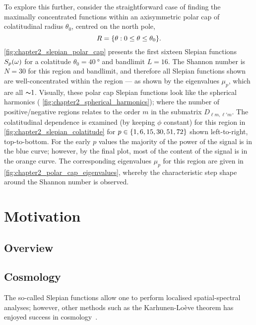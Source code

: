 To explore this further, consider the straightforward case of finding the maximally concentrated functions within an axisymmetric polar cap of colatitudinal radius \(\theta_{0}{}\), centred on the north pole, \ie{}
%
\begin{equation}
	R
	= \{\theta: 0 \leq \theta \leq \theta_{0}\}.
\end{equation}
%
\cref{fig:chapter2_slepian_polar_cap} presents the first sixteen Slepian functions \({S}_{p}(\omega)\) for a colatitude \(\theta_{0}=\SI{40}{\degree}\) and bandlimit \(L=16\).
The Shannon number is \(N=30\) for this region and bandlimit, and therefore all Slepian functions shown are well-concentrated within the region --- as shown by the eigenvalues \(\mu_{p}\), which are all \({\thicksim}1\).
Visually, these polar cap Slepian functions look like the spherical harmonics (\cf{} \cref{fig:chapter2_spherical_harmonics}); where the number of positive/negative regions relates to the order \(m\) in the submatrix \(D_{\ell m,\ell'm}\).
The colatitudinal dependence is examined (by keeping \(\phi{}\) constant) for this region in \cref{fig:chapter2_slepian_colatitude} for \(p \in \{1,6,15,30,51,72\}\) shown left-to-right, top-to-bottom.
For the early \(p\) values the majority of the power of the signal is in the blue curve; however, by the final plot, most of the content of the signal is in the orange curve.
The corresponding eigenvalues \(\mu_{p}\) for this region are given in \cref{fig:chapter2_polar_cap_eigenvalues}, whereby the characteristic step shape around the Shannon number is observed.







\section{Motivation}\label{sec:chapter2_motivation}

\subsection{Overview}

\subsection{Cosmology}

The so-called Slepian functions allow one to perform localised spatial-spectral analyses; however, other methods such as the Karhunen-Loève theorem has enjoyed success in cosmology~\cite{Tegmark1997,Bond1994,Bunn1995}.


